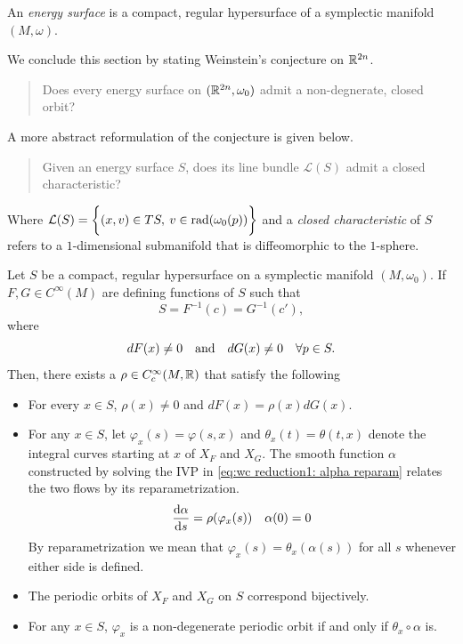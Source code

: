 \documentclass[../main-v2-manifolds.tex]{subfiles}
\begin{document}
\begin{definition}\label{def:energy surface}
    An \emph{energy surface} is a compact, regular hypersurface of a symplectic manifold $(M,\omega)$.
\end{definition}
We conclude this section by stating Weinstein's conjecture on ${\mathbb{R}^{2n}}$.
\begin{quote}
    Does every energy surface on $({\mathbb{R}^{2n}},\omega_0)$ admit a non-degnerate, closed orbit?
\end{quote}
A more abstract reformulation of the conjecture is given below.
\begin{quote}
    Given an energy surface $S$, does its line bundle $\mathcal{L}(S)$ admit a closed characteristic?
\end{quote}
Where $\mathcal{L}(S) = \biggl\{{(x,v)\in TS,\:  v\in \operatorname{rad}({\omega_0(p)})}\biggr\}$ and a \emph{closed characteristic} of $S$ refers to a $1$-dimensional submanifold that is diffeomorphic to the $1$-sphere.
\begin{wts}\label{thm:wc reduction 1 hamiltonian}
    Let $S$ be a compact, regular hypersurface on a symplectic manifold $(M,\omega_0)$. If $F, G\in C^\infty(M)$ are defining functions of $S$ such that
    \[S = F^{-1}(c) = G^{-1}(c'),\]
    where 
    \[dF(x)\neq 0\qqtext{and}dG(x)\neq 0\quad\forall p\in S.\]
    Then, there exists a $\rho\in C_c^\infty(M,\mathbb{R})$ that satisfy the following
    \begin{itemize}
        \item For every $x\in S$, $\rho(x)\neq 0$ and $dF(x) = \rho(x) dG(x)$.
        \item For any $x\in S$, let $\varphi_x(s) = \varphi(s,x)$ and $\theta_x(t) = \theta(t,x)$ denote the integral curves starting at $x$ of $X_F$ and $X_G$. The smooth function $\alpha$ constructed by solving the IVP in \cref{eq:wc reduction1: alpha reparam} relates the two flows by its reparametrization.
        \begin{equation}
            \dv{\alpha}{s} = \rho(\varphi_x(s))\quad\alpha(0)=0
            \label{eq:wc reduction1: alpha reparam}
        \end{equation}
        By reparametrization we mean that $\varphi_x(s) = \theta_x(\alpha(s))$ for all $s$ whenever either side is defined.
        \item The periodic orbits of $X_{F}$ and $X_G$ on $S$ correspond bijectively.
        \item For any $x\in S$, $\varphi_x$ is a non-degenerate periodic orbit if and only if $\theta_x\circ\alpha$ is.
    \end{itemize}
\end{wts}
\end{document}
